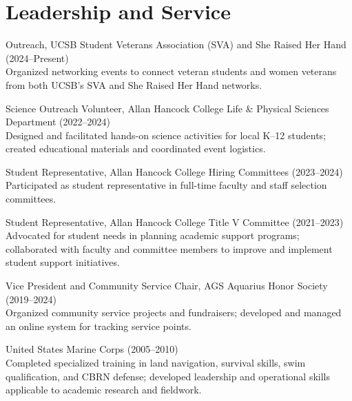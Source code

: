 \documentclass[letterpaper]{article}
\newenvironment{biblist}{%
   \begin{list}{}{%
     \setlength{\labelwidth}{0pt}%
     \setlength{\labelsep}{1em}%
     \setlength{\leftmargin}{2em}%
     \setlength{\itemindent}{-1em}%
   }
}{\end{list}}
\begin{document}
\section*{Leadership and Service}

\begin{biblist}

\item Outreach, UCSB Student Veterans Association (SVA) and She Raised Her Hand (2024--Present)\\
Organized networking events to connect veteran students and women veterans from both UCSB’s SVA and She Raised Her Hand networks.

\item Science Outreach Volunteer, Allan Hancock College Life \& Physical Sciences Department (2022--2024)\\
Designed and facilitated hands-on science activities for local K--12 students; created educational materials and coordinated event logistics.

\item Student Representative, Allan Hancock College Hiring Committees (2023--2024)\\
Participated as student representative in full-time faculty and staff selection committees.

\item Student Representative, Allan Hancock College Title V Committee (2021--2023)\\
Advocated for student needs in planning academic support programs; collaborated with faculty and committee members to improve and implement student support initiatives.

\item Vice President and Community Service Chair, AGS Aquarius Honor Society (2019--2024)\\
Organized community service projects and fundraisers; developed and managed an online system for tracking service points.

\item United States Marine Corps (2005--2010)\\
Completed specialized training in land navigation, survival skills, swim qualification, and CBRN defense; developed leadership and operational skills applicable to academic research and fieldwork.

\end{biblist}
\end{document}
